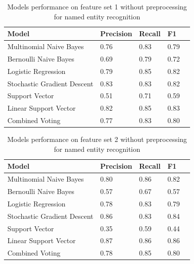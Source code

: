 \documentclass[11pt,oneside]{book}
\begin{document}
\begin{longtable}{|l|l|l|l|l|}
\caption{Models performance on feature set 1 without preprocessing for named entity recognition}
\label{tab:ner_feature_set_5}\\
\hline
\textbf{Model}          & \multicolumn{1}{c|}{\textbf{Precision}} & \multicolumn{1}{c|}{\textbf{Recall}} & \textbf{F1} \\ \hline
\endfirsthead
%
\endhead
%
Multinomial Naive Bayes &  0.76  & 0.83  & 0.79  \\ \hline
Bernoulli Naive Bayes       & 0.69 & 0.79 & 0.72   \\ \hline
Logistic Regression         & 0.79 & 0.85 & 0.82   \\ \hline
Stochastic Gradient Descent & 0.83 & 0.83 & 0.82   \\ \hline
Support Vector              & 0.51 & 0.71 & 0.59   \\ \hline
Linear Support Vector       & 0.82 & 0.85 & 0.83   \\ \hline
Combined Voting             & 0.77 & 0.83 & 0.80   \\ \hline
\end{longtable}

\begin{longtable}{|l|l|l|l|l|}
\caption{Models performance on feature set 2 without preprocessing for named entity recognition}
\label{tab:ner_feature_set_6}\\
\hline
\textbf{Model}          & \multicolumn{1}{c|}{\textbf{Precision}} & \multicolumn{1}{c|}{\textbf{Recall}} & \textbf{F1} \\ \hline
\endfirsthead
%
\endhead
%
Multinomial Naive Bayes &  0.80  & 0.86  & 0.82       \\ \hline
Bernoulli Naive Bayes       & 0.57 & 0.67 & 0.57   \\ \hline
Logistic Regression         & 0.78 & 0.83 & 0.79   \\ \hline
Stochastic Gradient Descent & 0.86 & 0.83 & 0.84   \\ \hline
Support Vector              & 0.35 & 0.59 & 0.44   \\ \hline
Linear Support Vector       & 0.87 & 0.86 & 0.86   \\ \hline
Combined Voting             & 0.78 & 0.85 & 0.80   \\ \hline
\end{longtable}
\end{document}
